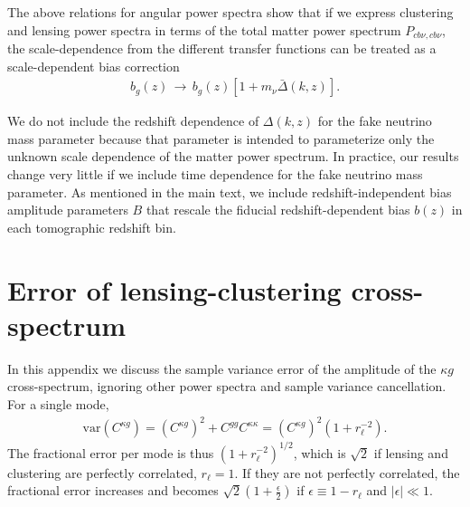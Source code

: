 \documentclass[prd,superscriptaddress,floatfix,notitlepage,nofootinbib,reprint]{revtex4-1} %
\begin{document}
The above relations for angular power spectra show that if we express clustering and lensing power spectra in terms of the total matter power spectrum $P_{cb\nu,cb\nu}$, the scale-dependence from the different transfer functions can be treated as a scale-dependent bias correction
\begin{align}
  \label{eq:24}
  b_g(z) \,\rightarrow\, b_g(z)\left[1+m_\nu\bar\Delta(k,z)\right].
\end{align}



We do not include the redshift dependence of $\Delta(k,z)$ for the fake neutrino mass parameter because that parameter is intended to parameterize only the unknown scale dependence of the matter power spectrum. 
In practice, our results change very little if we include time dependence for the fake neutrino mass parameter.
As mentioned in the main text, we include redshift-independent bias amplitude parameters $B$ that rescale the fiducial redshift-dependent bias $b(z)$ in each tomographic redshift bin.



\section{Error of lensing-clustering cross-spectrum}
\label{se:AnalyticalEstimateNoSVC}
In this appendix we discuss the sample variance error of the amplitude of the $\kappa g$ cross-spectrum, ignoring other power spectra and sample variance cancellation.
For a single mode,
\begin{align}
  \label{eq:tmp}
\mathrm{var}(C^{\kappa g})=(C^{\kappa g})^2+C^{gg}C^{\kappa\kappa}=(C^{\kappa g})^2(1+r_{\ell}^{-2}).
\end{align}
The fractional error per mode is thus $(1+r^{-2}_{\ell})^{1/2}$, which is $\sqrt{2}$ if lensing and clustering are perfectly correlated, $r_{\ell}=1$.
If they are not perfectly correlated, the fractional error increases and becomes $\sqrt{2}(1+\frac{\epsilon}{2})$ if $\epsilon\equiv 1-r_\ell$ and $|\epsilon| \ll 1$.
\end{document}
